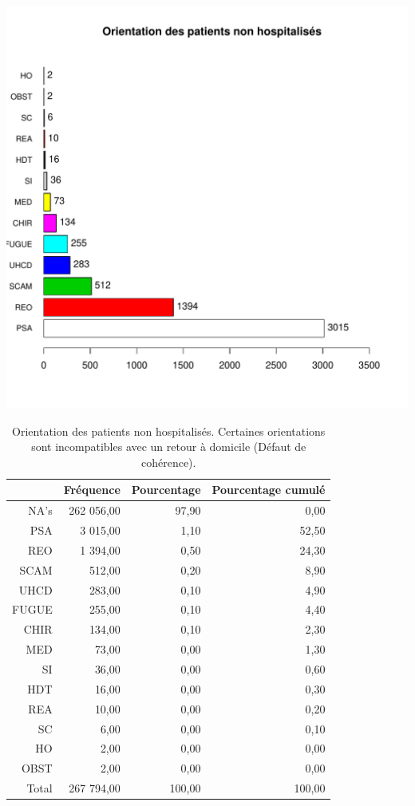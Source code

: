 \documentclass[12pt,english,french,twoside]{book}\usepackage[]{graphicx}\usepackage[]{color}
\makeatletter
\def\maxwidth{ %
  \ifdim\Gin@nat@width>\linewidth
    \linewidth
  \else
    \Gin@nat@width
  \fi
}
\makeatother
\begin{document}
\includegraphics[width=\maxwidth]{figure/fausses_sorties} 
\begin{table}[ht]
\centering
\begin{tabular}{rrrr}
  \hline
 & Fréquence & Pourcentage & Pourcentage cumulé \\ 
  \hline
NA's & 262 056,00 & 97,90 & 0,00 \\ 
  PSA & 3 015,00 & 1,10 & 52,50 \\ 
  REO & 1 394,00 & 0,50 & 24,30 \\ 
  SCAM & 512,00 & 0,20 & 8,90 \\ 
  UHCD & 283,00 & 0,10 & 4,90 \\ 
  FUGUE & 255,00 & 0,10 & 4,40 \\ 
  CHIR & 134,00 & 0,10 & 2,30 \\ 
  MED & 73,00 & 0,00 & 1,30 \\ 
  SI & 36,00 & 0,00 & 0,60 \\ 
  HDT & 16,00 & 0,00 & 0,30 \\ 
  REA & 10,00 & 0,00 & 0,20 \\ 
  SC & 6,00 & 0,00 & 0,10 \\ 
  HO & 2,00 & 0,00 & 0,00 \\ 
  OBST & 2,00 & 0,00 & 0,00 \\ 
    Total & 267 794,00 & 100,00 & 100,00 \\ 
   \hline
\end{tabular}
\caption[Orientation des patients non hospitalisés]{Orientation des patients non hospitalisés. Certaines orientations sont incompatibles avec un retour à domicile (Défaut de cohérence).} 
\label{tab:orient_nh}
\end{table}
\end{document}
